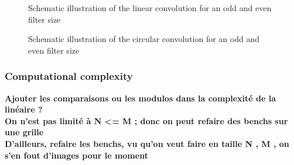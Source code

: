 \documentclass[a4paper,10pt,twoside]{article}
\begin{document}
\begin{figure}
\centering
\resizebox{18cm}{!}{}
\caption{\label{fig:linear_convolution} Schematic illustration of the linear convolution for an odd and even filter size}
\end{figure}

\begin{figure}
\centering
\resizebox{18cm}{!}{}
\caption{\label{fig:circular_convolution} Schematic illustration of the circular convolution for an odd and even filter size}
\end{figure}

\subsubsection{Computational complexity}
\textbf{Ajouter les comparaisons ou les modulos dans la complexité de la linéaire ?}\\
\textbf{On n'est pas limité à N <= M ; donc on peut refaire des benchs sur une grille}\\
\textbf{D'ailleurs, refaire les benchs, vu qu'on veut faire en taille N , M , on s'en fout d'images pour le moment}\\
\end{document}
